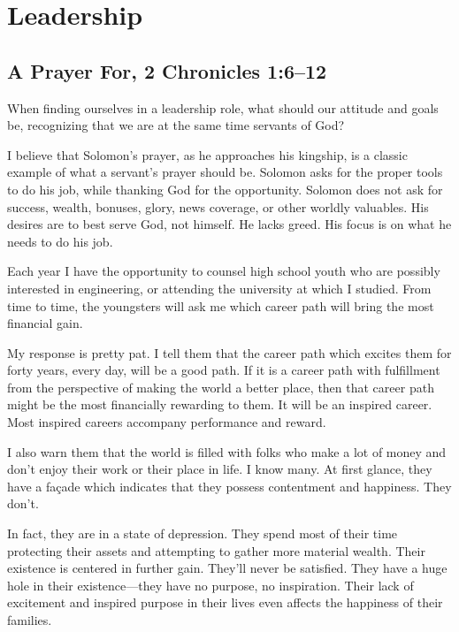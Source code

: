 \documentclass[12pt]{memoir}
\begin{document}
\section{Leadership}

\subsection[A Prayer For]{A Prayer For, 2 Chronicles 1:6--12}

When finding ourselves in a leadership role, what should our attitude and goals be, recognizing that we are at the same time servants of God?

I believe that Solomon's prayer, as he approaches his kingship, is a classic example of what a servant's prayer should be. Solomon asks for the proper tools to do his job, while thanking God for the opportunity.
Solomon does not ask for success, wealth, bonuses, glory, news coverage, or other worldly valuables. His desires are to best serve God, not
himself. He lacks greed. His focus is on what he needs to do his job.

Each year I have the opportunity to counsel high school youth who are possibly interested in engineering, or attending the university at which I
studied. From time to time, the youngsters will ask me which career
path will bring the most financial gain.

My response is pretty pat.
I tell them that the career path which excites them for forty years,
every day, will be a good path. If it is a career path with fulfillment from the perspective of making the world a better place, then that
career path might be the most financially rewarding to them. It will
be an inspired career. Most inspired careers accompany performance
and reward.

I also warn them that the world is filled with folks who make a lot of money and don't enjoy their work or their place in life. I know many. At first glance, they have a façade which indicates that they possess contentment and happiness. They don't.

In fact, they are in a state of depression. They spend most of their time protecting their assets and attempting to gather more material wealth. Their existence is centered in further gain. They'll never be satisfied. They have a huge hole in their existence---they have no purpose, no inspiration. Their
lack of excitement and inspired purpose in their lives even affects the happiness of their families. 
\end{document}
